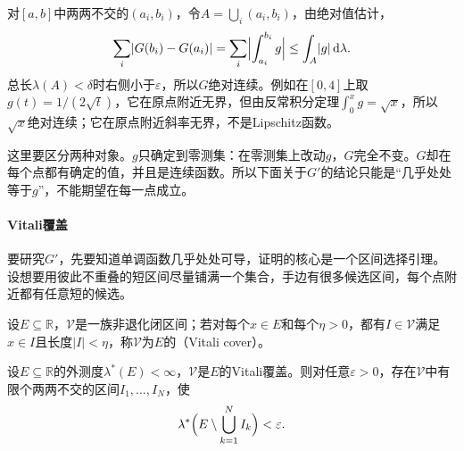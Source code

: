 对$[a,b]$中两两不交的$(a_i,b_i)$，令$A=\bigcup_i(a_i,b_i)$，由绝对值估计，
\[
 \sum_i\lvert G(b_i)-G(a_i)\rvert=\sum_i\Bigl\lvert\int_{a_i}^{b_i}g\Bigr\rvert\leq\int_A\lvert g\rvert\,\mathrm d\lambda .
\]
总长$\lambda(A)<\delta$时右侧小于$\varepsilon$，所以$G$绝对连续。例如在$[0,4]$上取$g(t)=1/(2\sqrt t)$，它在原点附近无界，但由反常积分定理$\int_0^xg=\sqrt x$，所以$\sqrt x$绝对连续；它在原点附近斜率无界，不是Lipschitz函数。

这里要区分两种对象。$g$只确定到零测集：在零测集上改动$g$，$G$完全不变。$G$却在每个点都有确定的值，并且是连续函数。所以下面关于$G'$的结论只能是“几乎处处等于$g$”，不能期望在每一点成立。

\paragraph{Vitali覆盖}
要研究$G'$，先要知道单调函数几乎处处可导，证明的核心是一个区间选择引理。设想要用彼此不重叠的短区间尽量铺满一个集合，手边有很多候选区间，每个点附近都有任意短的候选。

设$E\subseteq\mathbb R$，$\mathcal V$是一族非退化闭区间；若对每个$x\in E$和每个$\eta>0$，都有$I\in\mathcal V$满足$x\in I$且长度$\lvert I\rvert<\eta$，称$\mathcal V$为$E$的（Vitali cover）。

\begin{lemma}[Vitali覆盖引理]
\label{lem:integ-vitali}
设$E\subseteq\mathbb R$的外测度$\lambda^*(E)<\infty$，$\mathcal V$是$E$的Vitali覆盖。则对任意$\varepsilon>0$，存在$\mathcal V$中有限个两两不交的区间$I_1,\dots,I_N$，使
\begin{equation}
 \lambda^*\Bigl(E\setminus\bigcup_{k=1}^NI_k\Bigr)<\varepsilon .
 \label{eq:integ-vitali}
\end{equation}
\end{lemma}

